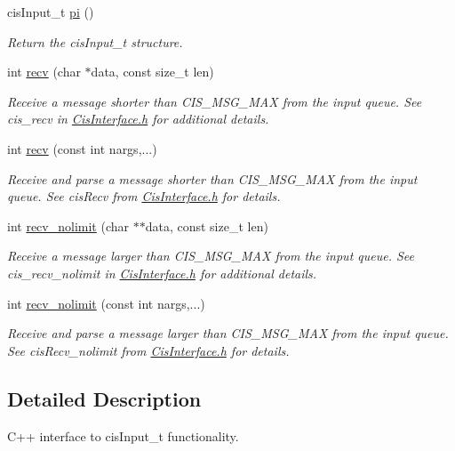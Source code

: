 \begin{DoxyCompactItemize}
cis\+Input\+\_\+t \mbox{\hyperlink{classCisInput_a2b560759fbd797db1dc049e886ce72e5}{pi}} ()
\begin{DoxyCompactList}\small\item\em Return the cis\+Input\+\_\+t structure. \end{DoxyCompactList}\item 
int \mbox{\hyperlink{classCisInput_aa05f26dd9d8db09e12da739831637a2a}{recv}} (char $\ast$data, const size\+\_\+t len)
\begin{DoxyCompactList}\small\item\em Receive a message shorter than C\+I\+S\+\_\+\+M\+S\+G\+\_\+\+M\+AX from the input queue. See cis\+\_\+recv in \mbox{\hyperlink{CisInterface_8h_source}{Cis\+Interface.\+h}} for additional details. \end{DoxyCompactList}\item 
int \mbox{\hyperlink{classCisInput_a387134ab4f750a06654946d4b92d412d}{recv}} (const int nargs,...)
\begin{DoxyCompactList}\small\item\em Receive and parse a message shorter than C\+I\+S\+\_\+\+M\+S\+G\+\_\+\+M\+AX from the input queue. See cis\+Recv from \mbox{\hyperlink{CisInterface_8h_source}{Cis\+Interface.\+h}} for details. \end{DoxyCompactList}\item 
int \mbox{\hyperlink{classCisInput_a962f5ebcac9d8b70fe3cd907da6dd3a9}{recv\+\_\+nolimit}} (char $\ast$$\ast$data, const size\+\_\+t len)
\begin{DoxyCompactList}\small\item\em Receive a message larger than C\+I\+S\+\_\+\+M\+S\+G\+\_\+\+M\+AX from the input queue. See cis\+\_\+recv\+\_\+nolimit in \mbox{\hyperlink{CisInterface_8h_source}{Cis\+Interface.\+h}} for additional details. \end{DoxyCompactList}\item 
int \mbox{\hyperlink{classCisInput_aa78610915e128dc1ed0d234271d2d656}{recv\+\_\+nolimit}} (const int nargs,...)
\begin{DoxyCompactList}\small\item\em Receive and parse a message larger than C\+I\+S\+\_\+\+M\+S\+G\+\_\+\+M\+AX from the input queue. See cis\+Recv\+\_\+nolimit from \mbox{\hyperlink{CisInterface_8h_source}{Cis\+Interface.\+h}} for details. \end{DoxyCompactList}\end{DoxyCompactItemize}


\subsection{Detailed Description}
C++ interface to cis\+Input\+\_\+t functionality. 

